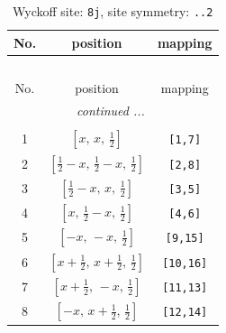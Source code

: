 \documentclass[fleqn,8pt]{jsarticle}
\begin{document}
\begin{longtable}{ccc}
\caption{Wyckoff site: {\tt 8j}, site symmetry: {\tt ..2}}
 \\
 \hline \hline
No. & position & mapping \\ \hline \endfirsthead

\multicolumn{2}{l}{\tablename\ \thetable{}} \\
 \hline \hline
No. & position & mapping \\ \hline \endhead

 \hline \hline
\multicolumn{2}{r}{\footnotesize\it continued ...} \\ \endfoot

 \hline \hline
\multicolumn{2}{r}{} \\ \endlastfoot

1 & $\left[ x,\, x,\, \frac{1}{2} \right]$ & {\tt [1,7]} \\ \hline
2 & $\left[ \frac{1}{2} - x,\, \frac{1}{2} - x,\, \frac{1}{2} \right]$ & {\tt [2,8]} \\ \hline
3 & $\left[ \frac{1}{2} - x,\, x,\, \frac{1}{2} \right]$ & {\tt [3,5]} \\ \hline
4 & $\left[ x,\, \frac{1}{2} - x,\, \frac{1}{2} \right]$ & {\tt [4,6]} \\ \hline
5 & $\left[ - x,\, - x,\, \frac{1}{2} \right]$ & {\tt [9,15]} \\ \hline
6 & $\left[ x + \frac{1}{2},\, x + \frac{1}{2},\, \frac{1}{2} \right]$ & {\tt [10,16]} \\ \hline
7 & $\left[ x + \frac{1}{2},\, - x,\, \frac{1}{2} \right]$ & {\tt [11,13]} \\ \hline
8 & $\left[ - x,\, x + \frac{1}{2},\, \frac{1}{2} \right]$ & {\tt [12,14]} \\
\end{longtable}
\renewcommand{\arraystretch}{1.2}
\end{document}
